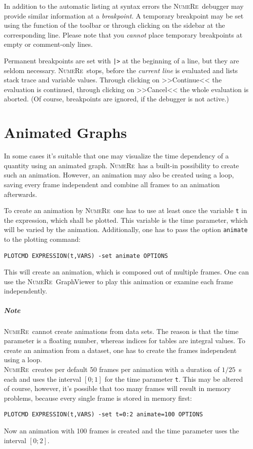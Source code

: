 \documentclass[DIV=14,headsepline,footsepline]{scrbook}
\newcommand{\NR}{\textsc{Nu\-me\-Re}}
\begin{document}
				In addition to the automatic listing at syntax errors the \NR\ debugger may provide similar information at a \emph{breakpoint}. A temporary breakpoint may be set using the function of the toolbar or through clicking on the sidebar at the corresponding line. Please note that you \emph{cannot} place temporary breakpoints at empty or comment-only lines.
				
				Permanent breakpoints are set with \lstinline+|>+ at the beginning of a line, but they are seldom necessary. \NR\ stops, before the \emph{current line} is evaluated and lists stack trace and variable values. Through clicking on >>Continue<< the evaluation is continued, through clicking on >>Cancel<< the whole evaluation is aborted. (Of course, breakpoints are ignored, if the debugger is not active.)
				
		\chapter{Animated Graphs}
			In some cases it's suitable that one may visualize the time dependency of a quantity using an animated graph. \NR\ has a built-in possibility to create such an animation. However, an animation may also be created using a loop, saving every frame independent and combine all frames to an animation afterwards.
			
			To create an animation by \NR\ one has to use at least once the variable \lstinline+t+ in the expression, which shall be plotted. This variable is the time parameter, which will be varied by the animation. Additionally, one has to pass the option \lstinline+animate+ to the plotting command:
			\begin{lstlisting}
PLOTCMD EXPRESSION(t,VARS) -set animate OPTIONS
			\end{lstlisting}
			This will create an animation, which is composed out of multiple frames. One can use the \NR\ Graph\-Viewer to play this animation or examine each frame independently.
			
			\paragraph{Note}
				\NR\ cannot create animations from data sets. The reason is that the time parameter is a floating number, whereas indices for tables are integral values. To create an animation from a dataset, one has to create the frames independent using a loop.\bigskip\\
			\NR\ creates per default 50 frames per animation with a duration of $1/25$~s each and uses the interval $[0;1]$ for the time parameter \lstinline+t+. This may be altered of course, however, it's possible that too many frames will result in memory problems, because every single frame is stored in memory first:
			\begin{lstlisting}
PLOTCMD EXPRESSION(t,VARS) -set t=0:2 animate=100 OPTIONS
			\end{lstlisting}
			Now an animation with 100 frames is created and the time parameter uses the interval $[0;2]$.
\end{document}
